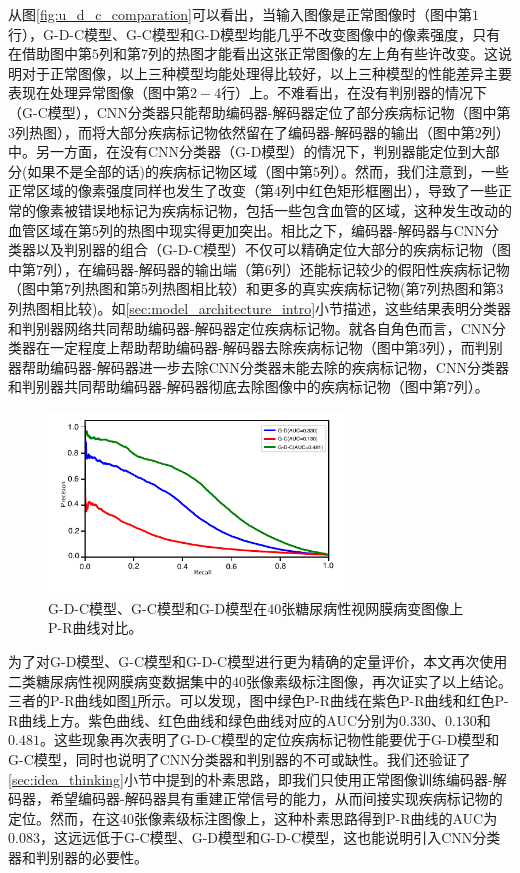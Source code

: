 从图\ref{fig:u_d_c_comparation}可以看出，当输入图像是正常图像时（图中第$1$行），G-D-C模型、G-C模型和G-D模型均能几乎不改变图像中的像素强度，只有在借助图中第$5$列和第$7$列的热图才能看出这张正常图像的左上角有些许改变。这说明对于正常图像，以上三种模型均能处理得比较好，以上三种模型的性能差异主要表现在处理异常图像（图中第$2-4$行）上。不难看出，在没有判别器的情况下（G-C模型），CNN分类器只能帮助编码器-解码器定位了部分疾病标记物（图中第$3$列热图），而将大部分疾病标记物依然留在了编码器-解码器的输出（图中第$2$列）中。另一方面，在没有CNN分类器（G-D模型）的情况下，判别器能定位到大部分(如果不是全部的话)的疾病标记物区域（图中第$5$列）。然而，我们注意到，一些正常区域的像素强度同样也发生了改变（第$4$列中红色矩形框圈出），导致了一些正常的像素被错误地标记为疾病标记物，包括一些包含血管的区域，这种发生改动的血管区域在第$5$列的热图中现实得更加突出。相比之下，编码器-解码器与CNN分类器以及判别器的组合（G-D-C模型）不仅可以精确定位大部分的疾病标记物（图中第$7$列），在编码器-解码器的输出端（第$6$列）还能标记较少的假阳性疾病标记物（图中第$7$列热图和第$5$列热图相比较）和更多的真实疾病标记物(第$7$列热图和第$3$列热图相比较)。如\ref{sec:model_architecture_intro}小节描述，这些结果表明分类器和判别器网络共同帮助编码器-解码器定位疾病标记物。就各自角色而言，CNN分类器在一定程度上帮助帮助编码器-解码器去除疾病标记物（图中第$3$列），而判别器帮助编码器-解码器进一步去除CNN分类器未能去除的疾病标记物，CNN分类器和判别器共同帮助编码器-解码器彻底去除图像中的疾病标记物（图中第$7$列）。
\begin{figure}[h]
	\centering
	\includegraphics[width=0.7\textwidth]{figure/pr_cureve_u_d_u_c_u_d_c_components.pdf}
	\caption[G-D-C模型、G-C模型和G-D模型P-R曲线对比]{G-D-C模型、G-C模型和G-D模型在$40$张糖尿病性视网膜病变图像上P-R曲线对比。}
	\label{fig:u_d_c_comparation_pr_curve}
\end{figure}

为了对G-D模型、G-C模型和G-D-C模型进行更为精确的定量评价，本文再次使用二类糖尿病性视网膜病变数据集中的$40$张像素级标注图像，再次证实了以上结论。三者的P-R曲线如图\ref{fig:u_d_c_comparation_pr_curve}所示。可以发现，图中绿色P-R曲线在紫色P-R曲线和红色P-R曲线上方。紫色曲线、红色曲线和绿色曲线对应的AUC分别为$0.330$、$0.130$和$0.481$。这些现象再次表明了G-D-C模型的定位疾病标记物性能要优于G-D模型和G-C模型，同时也说明了CNN分类器和判别器的不可或缺性。我们还验证了\ref{sec:idea_thinking}小节中提到的朴素思路，即我们只使用正常图像训练编码器-解码器，希望编码器-解码器具有重建正常信号的能力，从而间接实现疾病标记物的定位。然而，在这$40$张像素级标注图像上，这种朴素思路得到P-R曲线的AUC为$0.083$，这远远低于G-C模型、G-D模型和G-D-C模型，这也能说明引入CNN分类器和判别器的必要性。

